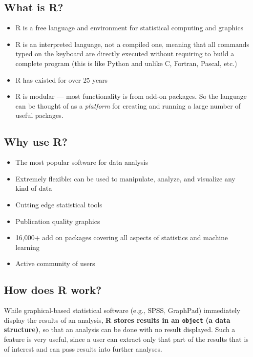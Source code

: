 \documentclass[
]{book}
\providecommand{\tightlist}{%
  \setlength{\itemsep}{0pt}\setlength{\parskip}{0pt}}
\begin{document}
\hypertarget{what-is-r}{%
\subsection{What is R?}\label{what-is-r}}

\begin{itemize}
\tightlist
\item
  R is a free language and environment for statistical computing and graphics
\item
  R is an interpreted language, not a compiled one, meaning that all commands
  typed on the keyboard are directly executed without requiring to build a complete
  program (this is like Python and unlike C, Fortran, Pascal, etc.)
\item
  R has existed for over 25 years
\item
  R is modular --- most functionality is from add-on packages. So the language can
  be thought of as a \emph{platform} for creating and running a large number of useful packages.
\end{itemize}

\hypertarget{why-use-r}{%
\subsection{Why use R?}\label{why-use-r}}

\begin{itemize}
\tightlist
\item
  The most popular software for data analysis
\item
  Extremely flexible: can be used to manipulate, analyze, and visualize
  any kind of data
\item
  Cutting edge statistical tools
\item
  Publication quality graphics
\item
  16,000+ add on packages covering all aspects of statistics and machine learning
\item
  Active community of users
\end{itemize}

\hypertarget{how-does-r-work}{%
\subsection{How does R work?}\label{how-does-r-work}}

While graphical-based statistical software (e.g., SPSS, GraphPad) immediately display
the results of an analysis, \textbf{R stores results in an \texttt{object} (a data structure)},
so that an analysis can be done with no result displayed. Such a feature is very
useful, since a user can extract only that part of the results that is of interest
and can pass results into further analyses.
\end{document}
